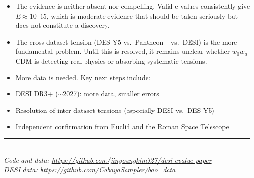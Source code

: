 \documentclass[11pt,a4paper]{article}
\begin{document}
\begin{itemize}
    \item The evidence is neither absent nor compelling. Valid e-values consistently give $E \approx 10$--$15$, which is moderate evidence that should be taken seriously but does not constitute a discovery.
    \item The cross-dataset tension (DES-Y5 vs.\ Pantheon+ vs.\ DESI) is the more fundamental problem. Until this is resolved, it remains unclear whether $w_0w_a$CDM is detecting real physics or absorbing systematic tensions.
    \item More data is needed. Key next steps include:
\end{itemize}
\begin{itemize}
    \item DESI DR3+ ($\sim$2027): more data, smaller errors
    \item Resolution of inter-dataset tensions (especially DESI vs.\ DES-Y5)
    \item Independent confirmation from Euclid and the Roman Space Telescope
\end{itemize}

\vfill

\begin{center}
\rule{0.5\textwidth}{0.4pt}\\[0.5em]
\textit{Code and data: \url{https://github.com/jinyoungkim927/desi-evalue-paper}}\\
\textit{DESI data: \url{https://github.com/CobayaSampler/bao_data}}
\end{center}
\end{document}
